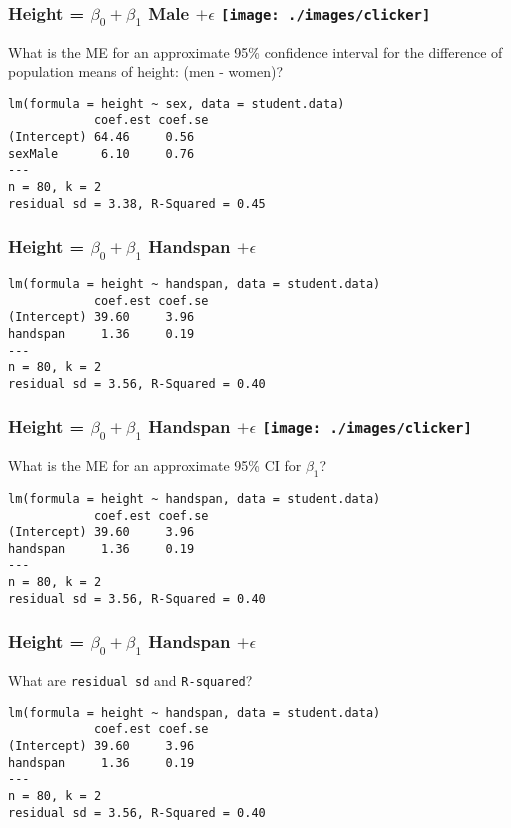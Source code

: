 \begin{frame}[fragile]
\frametitle{Height = $\beta_0 + \beta_1$ Male $+ \epsilon$ \hfill \texttt{[image: ./images/clicker]}}

\alert{What is the ME for an approximate 95\% confidence interval for the difference of population means of height: (men - women)?}

\footnotesize
\begin{verbatim}
lm(formula = height ~ sex, data = student.data)
            coef.est coef.se
(Intercept) 64.46     0.56  
sexMale      6.10     0.76  
---
n = 80, k = 2
residual sd = 3.38, R-Squared = 0.45
\end{verbatim}

\end{frame}





\begin{frame}[fragile]
\frametitle{Height = $\beta_0 + \beta_1$ Handspan $+ \epsilon$}
\footnotesize
\begin{verbatim}
lm(formula = height ~ handspan, data = student.data)
            coef.est coef.se
(Intercept) 39.60     3.96  
handspan     1.36     0.19  
---
n = 80, k = 2
residual sd = 3.56, R-Squared = 0.40
\end{verbatim}

\end{frame}
\begin{frame}[fragile]
\frametitle{Height = $\beta_0 + \beta_1$ Handspan $+ \epsilon$ \hfill \texttt{[image: ./images/clicker]}}
\alert{What is the ME for an approximate 95\% CI for $\beta_1$?}
\footnotesize
\begin{verbatim}
lm(formula = height ~ handspan, data = student.data)
            coef.est coef.se
(Intercept) 39.60     3.96  
handspan     1.36     0.19  
---
n = 80, k = 2
residual sd = 3.56, R-Squared = 0.40
\end{verbatim}
\end{frame}


\begin{frame}[fragile]
\frametitle{Height = $\beta_0 + \beta_1$ Handspan $+ \epsilon$}
\alert{What are \texttt{residual sd} and \texttt{R-squared}?}
\footnotesize
\begin{verbatim}
lm(formula = height ~ handspan, data = student.data)
            coef.est coef.se
(Intercept) 39.60     3.96  
handspan     1.36     0.19  
---
n = 80, k = 2
residual sd = 3.56, R-Squared = 0.40
\end{verbatim}
\end{frame}

